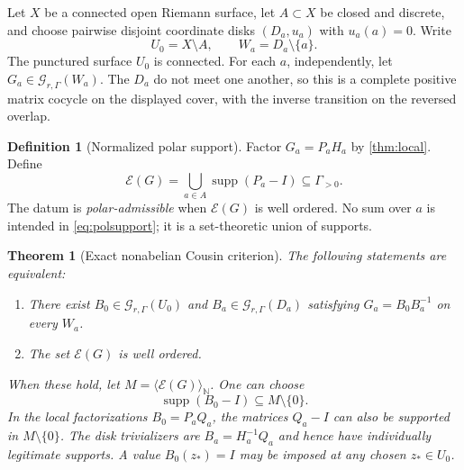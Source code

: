 \documentclass[11pt,letterpaper]{article}
\newtheorem{theorem}{Theorem}[section]
\theoremstyle{definition}
\newtheorem{definition}[definition]{Definition}
\theoremstyle{remark}
\newcommand{\N}{\mathbb N}
\newcommand{\GG}{\mathscr G_{r,\Gamma}}
\newcommand{\supp}{\operatorname{supp}}
\newcommand{\EU}{\mathcal E}
\newcommand{\angles}[1]{\langle #1\rangle_{\N}}
\numberwithin{equation}{section}
\begin{document}
Let $X$ be a connected open Riemann surface, let $A\subset X$ be closed and discrete, and choose pairwise disjoint coordinate disks $(D_a,u_a)$ with $u_a(a)=0$. Write
\[
 U_0=X\setminus A,\qquad W_a=D_a\setminus\{a\}.
\]
The punctured surface $U_0$ is connected. For each $a$, independently, let $G_a\in\GG(W_a)$. The $D_a$ do not meet one another, so this is a complete positive matrix cocycle on the displayed cover, with the inverse transition on the reversed overlap.

\begin{definition}[Normalized polar support]\label{def:polsupport}
Factor $G_a=P_aH_a$ by \cref{thm:local}. Define
\begin{equation}\label{eq:polsupport}
 \EU(G)=\bigcup_{a\in A}\supp(P_a-I)\subseteq\Gamma_{>0}.
\end{equation}
The datum is \emph{polar-admissible} when $\EU(G)$ is well ordered. No sum over $a$ is intended in \eqref{eq:polsupport}; it is a set-theoretic union of supports.
\end{definition}

\begin{theorem}[Exact nonabelian Cousin criterion]\label{thm:criterion}
The following statements are equivalent:
\begin{enumerate}[label=\textup{(\roman*)}]
\item There exist $B_0\in\GG(U_0)$ and $B_a\in\GG(D_a)$ satisfying $G_a=B_0B_a^{-1}$ on every $W_a$.
\item The set $\EU(G)$ is well ordered.
\end{enumerate}
When these hold, let $M=\angles{\EU(G)}$. One can choose
\begin{equation}\label{eq:centralsupport}
 \supp(B_0-I)\subseteq M\setminus\{0\}.
\end{equation}
In the local factorizations $B_0=P_aQ_a$, the matrices $Q_a-I$ can also be supported in $M\setminus\{0\}$. The disk trivializers are $B_a=H_a^{-1}Q_a$ and hence have individually legitimate supports. A value $B_0(z_*)=I$ may be imposed at any chosen $z_*\in U_0$.
\end{theorem}
\end{document}
